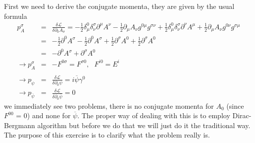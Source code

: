 \documentclass[aps,preprint,preprintnumbers,nofootinbib,showpacs,prd]{revtex4-1}
\newcommand{\nbea}{\begin{eqnarray*}}
\newcommand{\neea}{\end{eqnarray*}}
\begin{document}
First we need to derive the conjugate momenta, they are given by the usual formula
%
\nbea
p_A^{\sigma} & = & \frac{\delta \mathcal{L}}{\delta \partial_0 A_\sigma} = -\frac{1}{2} \delta^0_\mu \delta^\sigma_\nu \partial^\mu A^\nu - \frac{1}{2} \partial_\mu A_\nu g^{0\mu} g^{\sigma\nu} + \frac{1}{2} \delta^0_\mu \delta^\sigma_\nu \partial^\nu A^\mu + \frac{1}{2} \partial_\mu A_\nu g^{0\nu} g^{\sigma\mu} \\
& = &  - \frac{1}{2} \partial^0 A^\sigma - \frac{1}{2} \partial^0 A^\sigma + \frac{1}{2} \partial^\sigma A^0 + \frac{1}{2} \partial^\sigma A^0 \\
& = & - \partial^0 A^\sigma + \partial^\sigma A^0 \\
\rightarrow p_A^{\sigma} & = & - F^{0\sigma} = F^{\sigma 0},~~~ F^{i0} = E^i\\ \\
\rightarrow p_\psi & = & \frac{\delta \mathcal{L}}{\delta \partial_0 \psi} = i \overline \psi \gamma^0 \\
\rightarrow p_{\overline \psi} & = & \frac{\delta \mathcal{L}}{\delta \partial_0 {\overline \psi}} = 0
\neea
%
we immediately see two problems, there is no conjugate momenta for $A_0$ (since $F^{00}$ = 0) and none for $\overline \psi$. The proper way of dealing with this is to employ Dirac-Bergmann algorithm but before we do that we will just do it the traditional way. The purpose of this exercise is to clarify what the problem really is.
\end{document}
